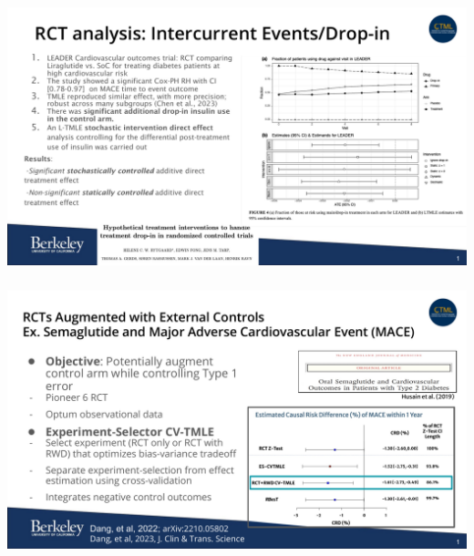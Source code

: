 \documentclass[t]{beamer}
\begin{document}
\begin{frame}
\frametitle{}
\vspace{20pt}
\begin{center}
\includegraphics[width=\textwidth]{figures/7-FDA-RWE-Subcommittee.pdf}
\end{center}
\vspace{35pt}
\end{frame}
\begin{frame}
\frametitle{}
\vspace{20pt}
\begin{center}
\includegraphics[width=\textwidth]{figures/8-FDA-RWE-Subcommittee.pdf}
\end{center}
\vspace{35pt}
\end{frame}
\end{document}
